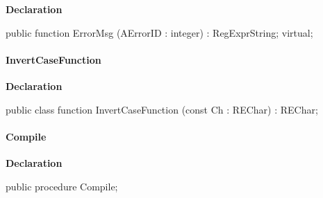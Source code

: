 \documentclass{report}
\newif\ifpdf
\begin{document}
\label{RegExpr.TRegExpr-ErrorMsg}
\begin{list}{}{
\setlength{\itemindent}{0cm}
\setlength{\listparindent}{0cm}
\setlength{\leftmargin}{\evensidemargin}
\addtolength{\leftmargin}{\tmplength}
\settowidth{\labelsep}{X}
\addtolength{\leftmargin}{\labelsep}
\setlength{\labelwidth}{\tmplength}
}
\item[\textbf{Declaration}\hfill]
\ifpdf
\begin{flushleft}
\fi
\begin{ttfamily}
public function ErrorMsg (AErrorID : integer) : RegExprString; virtual;\end{ttfamily}

\ifpdf
\end{flushleft}
\fi

\end{list}
\paragraph*{InvertCaseFunction}\hspace*{\fill}

\label{RegExpr.TRegExpr-InvertCaseFunction}
\begin{list}{}{
\setlength{\itemindent}{0cm}
\setlength{\listparindent}{0cm}
\setlength{\leftmargin}{\evensidemargin}
\addtolength{\leftmargin}{\tmplength}
\settowidth{\labelsep}{X}
\addtolength{\leftmargin}{\labelsep}
\setlength{\labelwidth}{\tmplength}
}
\item[\textbf{Declaration}\hfill]
\ifpdf
\begin{flushleft}
\fi
\begin{ttfamily}
public class function InvertCaseFunction (const Ch : REChar) : REChar;\end{ttfamily}

\ifpdf
\end{flushleft}
\fi

\end{list}
\paragraph*{Compile}\hspace*{\fill}

\label{RegExpr.TRegExpr-Compile}
\begin{list}{}{
\setlength{\itemindent}{0cm}
\setlength{\listparindent}{0cm}
\setlength{\leftmargin}{\evensidemargin}
\addtolength{\leftmargin}{\tmplength}
\settowidth{\labelsep}{X}
\addtolength{\leftmargin}{\labelsep}
\setlength{\labelwidth}{\tmplength}
}
\item[\textbf{Declaration}\hfill]
\ifpdf
\begin{flushleft}
\fi
\begin{ttfamily}
public procedure Compile;\end{ttfamily}

\ifpdf
\end{flushleft}
\fi

\end{list}
\end{document}
